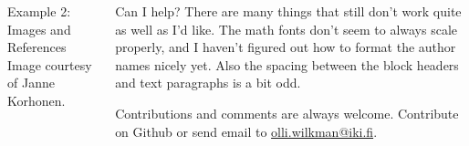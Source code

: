 \documentclass[final]{beamer}
\begin{document}
\begin{frame}[t, fragile]
\begin{columns}[T]
\begin{block}{Example 2: Images and References}
Image courtesy of Janne Korhonen.
\end{block}

\begin{block}{Can I help?}
There are many things that still don't work quite as well as I'd like. The math fonts don't seem to always scale properly, and I haven't figured out how to format the author names nicely yet. Also the spacing between the block headers and text paragraphs is a bit odd.

Contributions and comments are always welcome. Contribute on Github or send email to \url{olli.wilkman@iki.fi}.
\end{block}
	
\column{0.05\paperwidth}
\end{columns}
\end{frame}
\end{document}
